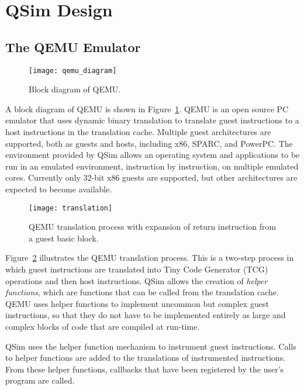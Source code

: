 \documentclass[letterpaper, 10pt]{book}
\begin{document}
\section{QSim Design}

\subsection{The QEMU Emulator}

\begin{figure}
\begin{center}
\texttt{[image: qemu\_diagram]}
\caption{Block diagram of QEMU.}
\label{fig:qemu}
\end{center}
\end{figure}

A block diagram of QEMU is shown in Figure~\ref{fig:qemu}. QEMU is an open
source PC emulator that uses dynamic binary translation to translate guest
instructions to a host instructions in the translation cache. Multiple
guest architectures are supported, both as guests and hosts, including x86,
SPARC, and PowerPC. The environment provided by QSim allows an operating system
and applications to be run in an emulated environment, instruction by
instruction, on multiple emulated cores. Currently only 32-bit x86 guests are
supported, but other architectures are expected to become available.

\begin{figure}
\begin{center}
\texttt{[image: translation]}
\caption{QEMU translation process with expansion of return instruction from a
  guest basic block.}
\label{fig:translation}
\end{center}
\end{figure}

Figure~\ref{fig:translation} illustrates the QEMU translation process. This is a
two-step process in which guest instructions are translated into Tiny Code
Generator (TCG) operations and then host instructions. QSim allows the creation
of \emph{helper functions}, which are functions that can be called from the
translation cache. QEMU uses helper functions to implement uncommon but complex
guest instructions, so that they do not have to be implemented entirely as large
and complex blocks of code that are compiled at run-time.

QSim uses the helper function mechanism to instrument guest instructions. Calls
to helper functions are added to the translations of instrumented instructions.
From these helper functions, callbacks that have been registered by the user's
program are called.
\end{document}
